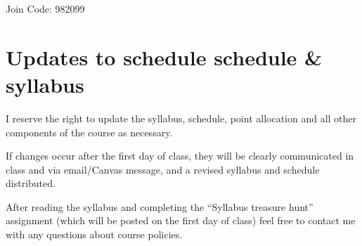 \documentclass[
]{book}
\begin{document}
Join Code: 982099

\hypertarget{updates-to-schedule-schedule-syllabus}{%
\chapter{Updates to schedule schedule \& syllabus}\label{updates-to-schedule-schedule-syllabus}}

I reserve the right to update the syllabus, schedule, point allocation and all other components of the course as necessary.

If changes occur after the first day of class, they will be clearly communicated in class and via email/Canvas message, and a revised syllabus and schedule distributed.

After reading the syllabus and completing the ``Syllabus treasure hunt'' assignment (which will be posted on the first day of class) feel free to contact me with any questions about course policies.

  
\end{document}
